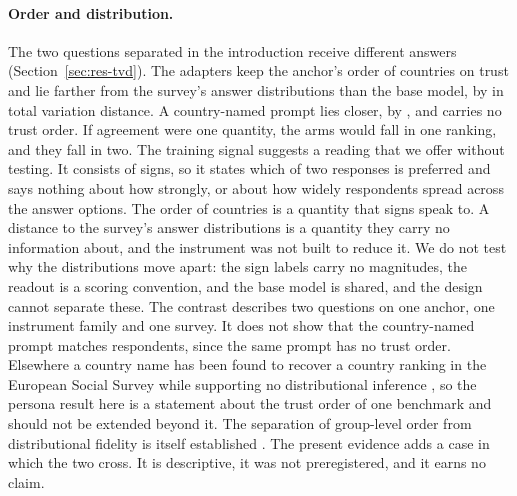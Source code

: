 \paragraph{Order and distribution.} The two questions separated in the introduction receive different answers (Section~\ref{sec:res-tvd}). The adapters keep the anchor's order of countries on trust and lie farther from the survey's answer distributions than the base model, by   in total variation distance. A country-named prompt lies closer, by  , and carries no trust order. If agreement were one quantity, the arms would fall in one ranking, and they fall in two. The training signal suggests a reading that we offer without testing. It consists of signs, so it states which of two responses is preferred and says nothing about how strongly, or about how widely respondents spread across the answer options. The order of countries is a quantity that signs speak to. A distance to the survey's answer distributions is a quantity they carry no information about, and the instrument was not built to reduce it. We do not test why the distributions move apart: the sign labels carry no magnitudes, the readout is a scoring convention, and the base model is shared, and the design cannot separate these. The contrast describes two questions on one anchor, one instrument family and one survey. It does not show that the country-named prompt matches respondents, since the same prompt has no trust order. Elsewhere a country name has been found to recover a country ranking in the European Social Survey while supporting no distributional inference \citep{wangc2026}, so the persona result here is a statement about the trust order of one benchmark and should not be extended beyond it. The separation of group-level order from distributional fidelity is itself established \citep{dasilva2026}. The present evidence adds a case in which the two cross. It is descriptive, it was not preregistered, and it earns no claim.

